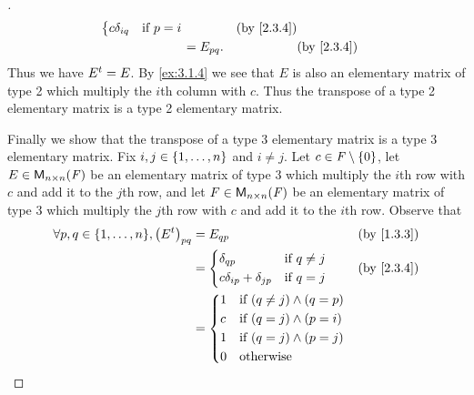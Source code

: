\begin{proof}[]
\begin{align*}
\begin{dcases}
			                                                          c \delta_{i q} & \text{if } p = i
		                                                          \end{dcases}    &  & \by{2.3.4}                     \\
		                                                      & = E_{p q}.                                 &  & \by{2.3.4}
	\end{align*}
	Thus we have \({E}^{t} = E\).
	By \cref{ex:3.1.4} we see that \(E\) is also an elementary matrix of type 2 which multiply the \(i\)th column with \(c\).
	Thus the transpose of a type 2 elementary matrix is a type 2 elementary matrix.

	Finally we show that the transpose of a type 3 elementary matrix is a type 3 elementary matrix.
	Fix \(i, j \in \left\lbrace1, \dots, n\right\rbrace\) and \(i \neq j\).
	Let \(c \in \mathit{F} \setminus \left\lbrace0\right\rbrace\), let \(E \in \mathsf{M}_{{n} \times n}({\mathit{F}})\) be an elementary matrix of type 3 which multiply the \(i\)th row with \(c\) and add it to the \(j\)th row, and let \(F \in \mathsf{M}_{{n} \times n}({\mathit{F}})\) be an elementary matrix of type 3 which multiply the \(j\)th row with \(c\) and add it to the \(i\)th row.
	Observe that
	\begin{align*}
		\forall p, q \in \set{1, \dots, n}, \pa{\tp{E}}_{p q} & = E_{q p}                                              &  & \by{1.3.3} \\
		                                                      & = \begin{dcases}
			                                                          \delta_{q p}                  & \text{if } q \neq j \\
			                                                          c \delta_{i p} + \delta_{j p} & \text{if } q = j
		                                                          \end{dcases} &  & \by{2.3.4}                  \\
		                                                      & = \begin{dcases}
			                                                          1 & \text{if } (q \neq j) \land (q = p) \\
			                                                          c & \text{if } (q = j) \land (p = i)    \\
			                                                          1 & \text{if } (q = j) \land (p = j)    \\
			                                                          0 & \text{otherwise}

\end{dcases}
\end{align*}
\end{proof}
